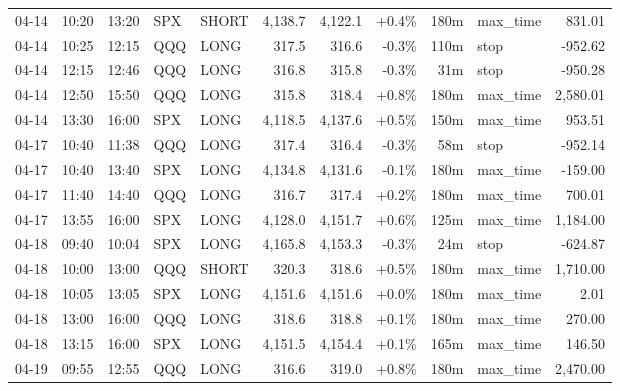 \documentclass[11pt,a4paper,twoside]{article}
\begin{document}
\begin{center}
\begin{longtable}{>{\color{txtmain}}l l l l l r r r r >{\color{txtmain}}l r}
04-14 & 10:20 & 13:20 & SPX & SHORT & 4,138.7 & 4,122.1 & \textcolor{wingreen}{+0.4\%} & 180m & max\_time & \textcolor{wingreen}{831.01} \\
04-14 & 10:25 & 12:15 & QQQ & LONG & 317.5 & 316.6 & \textcolor{lossred}{-0.3\%} & 110m & stop & \textcolor{lossred}{-952.62} \\
04-14 & 12:15 & 12:46 & QQQ & LONG & 316.8 & 315.8 & \textcolor{lossred}{-0.3\%} & 31m & stop & \textcolor{lossred}{-950.28} \\
04-14 & 12:50 & 15:50 & QQQ & LONG & 315.8 & 318.4 & \textcolor{wingreen}{+0.8\%} & 180m & max\_time & \textcolor{wingreen}{2,580.01} \\
04-14 & 13:30 & 16:00 & SPX & LONG & 4,118.5 & 4,137.6 & \textcolor{wingreen}{+0.5\%} & 150m & max\_time & \textcolor{wingreen}{953.51} \\
04-17 & 10:40 & 11:38 & QQQ & LONG & 317.4 & 316.4 & \textcolor{lossred}{-0.3\%} & 58m & stop & \textcolor{lossred}{-952.14} \\
04-17 & 10:40 & 13:40 & SPX & LONG & 4,134.8 & 4,131.6 & \textcolor{lossred}{-0.1\%} & 180m & max\_time & \textcolor{lossred}{-159.00} \\
04-17 & 11:40 & 14:40 & QQQ & LONG & 316.7 & 317.4 & \textcolor{wingreen}{+0.2\%} & 180m & max\_time & \textcolor{wingreen}{700.01} \\
04-17 & 13:55 & 16:00 & SPX & LONG & 4,128.0 & 4,151.7 & \textcolor{wingreen}{+0.6\%} & 125m & max\_time & \textcolor{wingreen}{1,184.00} \\
04-18 & 09:40 & 10:04 & SPX & LONG & 4,165.8 & 4,153.3 & \textcolor{lossred}{-0.3\%} & 24m & stop & \textcolor{lossred}{-624.87} \\
04-18 & 10:00 & 13:00 & QQQ & SHORT & 320.3 & 318.6 & \textcolor{wingreen}{+0.5\%} & 180m & max\_time & \textcolor{wingreen}{1,710.00} \\
04-18 & 10:05 & 13:05 & SPX & LONG & 4,151.6 & 4,151.6 & \textcolor{wingreen}{+0.0\%} & 180m & max\_time & \textcolor{wingreen}{2.01} \\
04-18 & 13:00 & 16:00 & QQQ & LONG & 318.6 & 318.8 & \textcolor{wingreen}{+0.1\%} & 180m & max\_time & \textcolor{wingreen}{270.00} \\
04-18 & 13:15 & 16:00 & SPX & LONG & 4,151.5 & 4,154.4 & \textcolor{wingreen}{+0.1\%} & 165m & max\_time & \textcolor{wingreen}{146.50} \\
04-19 & 09:55 & 12:55 & QQQ & LONG & 316.6 & 319.0 & \textcolor{wingreen}{+0.8\%} & 180m & max\_time & \textcolor{wingreen}{2,470.00} \\

\end{longtable}
\end{center}
\end{document}
